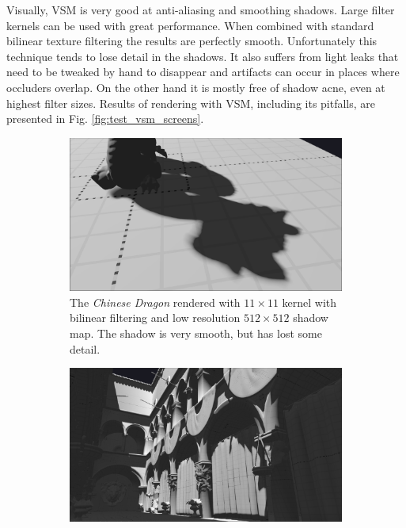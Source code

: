 Visually, VSM is very good at anti-aliasing and smoothing shadows. Large filter kernels can be used with great performance. When combined with standard bilinear texture filtering the results are perfectly smooth. Unfortunately this technique tends to lose detail in the shadows. It also suffers from light leaks that need to be tweaked by hand to disappear and artifacts can occur in places where occluders overlap. On the other hand it is mostly free of shadow acne, even at highest filter sizes. Results of rendering with VSM, including its pitfalls, are presented in Fig. \ref{fig:test_vsm_screens}.

\begin{figure}[h]
    \centering
    \begin{subfigure}[t]{0.49\textwidth}
		\centering
        \includegraphics[width=\textwidth]{./graf/tests/vsm/cropped/dragon_vsm_512_23_smooth.png}
        \caption{The \textit{Chinese Dragon} rendered with \(11\times 11\) kernel with bilinear filtering and low resolution \(512\times 512\) shadow map. The shadow is very smooth, but has lost some detail.}
    \end{subfigure}
	\hfill
    \begin{subfigure}[t]{0.49\textwidth}
		\centering
        \includegraphics[width=\textwidth]{./graf/tests/vsm/cropped/sponza_vsm_4096_23.png}

\end{subfigure}
\end{figure}
